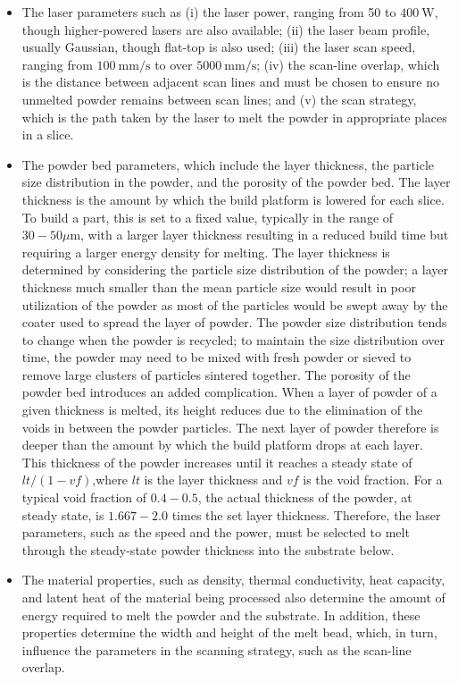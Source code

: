 \documentclass[10pt]{article}
\begin{document}
\begin{itemize}
  \item The laser parameters such as (i) the laser power, ranging from 50 to $400 \mathrm{~W}$, though higher-powered lasers are also available; (ii) the laser beam profile, usually Gaussian, though flat-top is also used; (iii) the laser scan speed, ranging from $100 \mathrm{~mm} / \mathrm{s}$ to over $5000 \mathrm{~mm} / \mathrm{s}$; (iv) the scan-line overlap, which is the distance between adjacent scan lines and must be chosen to ensure no unmelted powder remains between scan lines; and (v) the scan strategy, which is the path taken by the laser to melt the powder in appropriate places in a slice.

  \item The powder bed parameters, which include the layer thickness, the particle size distribution in the powder, and the porosity of the powder bed. The layer thickness is the amount by which the build platform is lowered for each slice. To build a part, this is set to a fixed value, typically in the range of $30-50 \mu \mathrm{m}$, with a larger layer thickness resulting in a reduced build time but requiring a larger energy density for melting. The layer thickness is determined by considering the particle size distribution of the powder; a layer thickness much smaller than the mean particle size would result in poor utilization of the powder as most of the particles would be swept away by the coater used to spread the layer of powder. The powder size distribution tends to change when the powder is recycled; to maintain the size distribution over time, the powder may need to be mixed with fresh powder or sieved to remove large clusters of particles sintered together. The porosity of the powder bed introduces an added complication. When a layer of powder of a given thickness is melted, its height reduces due to the elimination of the voids in between the powder particles. The next layer of powder therefore is deeper than the amount by which the build platform drops at each layer. This thickness of the powder increases until it reaches a steady state of $l t /(1-v f)$,where $l t$ is the layer thickness and $v f$ is the void fraction. For a typical void fraction of $0.4-0.5$, the actual thickness of the powder, at steady state, is $1.667-2.0$ times the set layer thickness. Therefore, the laser parameters, such as the speed and the power, must be selected to melt through the steady-state powder thickness into the substrate below.

  \item The material properties, such as density, thermal conductivity, heat capacity, and latent heat of the material being processed also determine the amount of energy required to melt the powder and the substrate. In addition, these properties determine the width and height of the melt bead, which, in turn, influence the parameters in the scanning strategy, such as the scan-line overlap.

\end{itemize}
\end{document}
